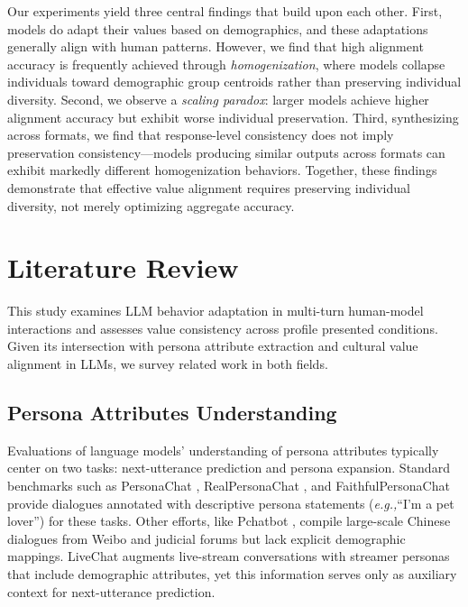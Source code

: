 \documentclass[final]{clv2025}
\newcommand{\eg}{\textit{e.g.,}\xspace}
\begin{document}
Our experiments yield three central findings that build upon each other. First, models do adapt their values based on demographics, and these adaptations generally align with human patterns. However, we find that high alignment accuracy is frequently achieved through \textit{homogenization}, where models collapse individuals toward demographic group centroids rather than preserving individual diversity. Second, we observe a \textit{scaling paradox}: larger models achieve higher alignment accuracy but exhibit worse individual preservation. Third, synthesizing across formats, we find that response-level consistency does not imply preservation consistency---models producing similar outputs across formats can exhibit markedly different homogenization behaviors. Together, these findings demonstrate that effective value alignment requires preserving individual diversity, not merely optimizing aggregate accuracy.

\section{Literature Review}

This study examines LLM behavior adaptation in multi-turn human-model interactions and assesses value consistency across profile presented conditions. Given its intersection with persona attribute extraction and cultural value alignment in LLMs, we survey related work in both fields.

\subsection{Persona Attributes Understanding}

Evaluations of language models' understanding of persona attributes typically center on two tasks: next-utterance prediction and persona expansion. Standard benchmarks such as PersonaChat \citep{personachat}, RealPersonaChat \citep{realpersonachat}, and FaithfulPersonaChat \citep{faithfulPersonaChat} provide dialogues annotated with descriptive persona statements (\eg ``I'm a pet lover'') for these tasks. Other efforts, like Pchatbot \citep{pchatbot}, compile large-scale Chinese dialogues from Weibo and judicial forums but lack explicit demographic mappings. LiveChat \citep{gao-etal-2023-livechat} augments live-stream conversations with streamer personas that include demographic attributes, yet this information serves only as auxiliary context for next-utterance prediction.
\end{document}
